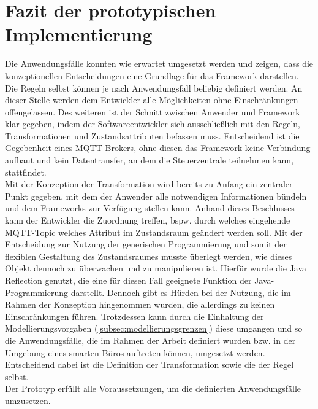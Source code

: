     \section{Fazit der prototypischen Implementierung}
        Die Anwendungsfälle konnten wie erwartet umgesetzt werden und zeigen, dass die konzeptionellen Entscheidungen eine Grundlage für das 
        Framework darstellen. Die Regeln selbst können je nach Anwendungsfall beliebig definiert werden. An dieser Stelle werden dem 
        Entwickler alle Möglichkeiten ohne Einschränkungen offengelassen. Des weiteren ist der Schnitt zwischen 
        Anwender und Framework klar gegeben, indem der Softwareentwickler sich ausschließlich mit den Regeln, Transformationen und Zustandsattributen 
        befassen muss. Entscheidend ist die Gegebenheit eines \acs{MQTT}-Brokers, ohne diesen das Framework keine Verbindung aufbaut und kein Datentransfer, an dem 
        die Steuerzentrale teilnehmen kann, stattfindet. 
        \\
        \linebreak
        Mit der Konzeption der Transformation wird bereits zu Anfang ein zentraler Punkt gegeben, mit dem der Anwender alle notwendigen Informationen 
        bündeln und dem Frameworks zur Verfügung stellen kann. Anhand dieses Beschlusses kann der Entwickler die Zuordnung treffen, bspw. durch welches 
        eingehende \acs{MQTT}-Topic welches Attribut im Zustandsraum geändert werden soll. Mit der Entscheidung zur Nutzung der generischen Programmierung 
        und somit der flexiblen Gestaltung des Zustandsraumes musste überlegt werden, wie dieses Objekt dennoch zu überwachen und zu manipulieren ist. 
        Hierfür wurde die Java Reflection genutzt, die eine für diesen Fall geeignete Funktion der Java-Programmierung darstellt. Dennoch gibt es Hürden bei der Nutzung, 
        die im Rahmen der Konzeption hingenommen wurden, die allerdings zu keinen Einschränkungen führen. Trotzdessen kann durch die Einhaltung 
        der Modellierungsvorgaben (\ref{subsec:modellierungsgrenzen}) diese umgangen und so die Anwendungsfälle, die im Rahmen der Arbeit 
        definiert wurden bzw. in der Umgebung eines smarten Büros auftreten können, umgesetzt werden. Entscheidend dabei ist die Definition der 
        Transformation sowie die der Regel selbst. 
        \\
        Der Prototyp erfüllt alle Voraussetzungen, um die definierten Anwendungsfälle umzusetzen.
    
